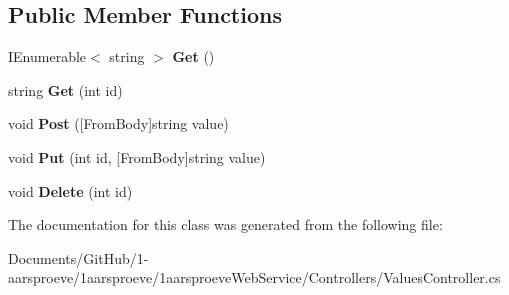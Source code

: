 \subsection*{Public Member Functions}
\begin{DoxyCompactItemize}
\item 
\hypertarget{class__1aarsproeve_web_service_1_1_controllers_1_1_values_controller_a6aabdf6d41689230f8c9ac16bd6e0cf2}{}I\+Enumerable$<$ string $>$ {\bfseries Get} ()\label{class__1aarsproeve_web_service_1_1_controllers_1_1_values_controller_a6aabdf6d41689230f8c9ac16bd6e0cf2}

\item 
\hypertarget{class__1aarsproeve_web_service_1_1_controllers_1_1_values_controller_a23709bd2085124a4a9523ee83f3f2458}{}string {\bfseries Get} (int id)\label{class__1aarsproeve_web_service_1_1_controllers_1_1_values_controller_a23709bd2085124a4a9523ee83f3f2458}

\item 
\hypertarget{class__1aarsproeve_web_service_1_1_controllers_1_1_values_controller_a67e206660305cb8c2e3245c6cbe137d2}{}void {\bfseries Post} (\mbox{[}From\+Body\mbox{]}string value)\label{class__1aarsproeve_web_service_1_1_controllers_1_1_values_controller_a67e206660305cb8c2e3245c6cbe137d2}

\item 
\hypertarget{class__1aarsproeve_web_service_1_1_controllers_1_1_values_controller_a050db0929ea30dc0e8ad7a296ba7f348}{}void {\bfseries Put} (int id, \mbox{[}From\+Body\mbox{]}string value)\label{class__1aarsproeve_web_service_1_1_controllers_1_1_values_controller_a050db0929ea30dc0e8ad7a296ba7f348}

\item 
\hypertarget{class__1aarsproeve_web_service_1_1_controllers_1_1_values_controller_aea45aefd356d052c838878691e7fb645}{}void {\bfseries Delete} (int id)\label{class__1aarsproeve_web_service_1_1_controllers_1_1_values_controller_aea45aefd356d052c838878691e7fb645}

\end{DoxyCompactItemize}


The documentation for this class was generated from the following file\+:\begin{DoxyCompactItemize}
\item 
Documents/\+Git\+Hub/1-\/aarsproeve/1aarsproeve/1aarsproeve\+Web\+Service/\+Controllers/Values\+Controller.\+cs\end{DoxyCompactItemize}
